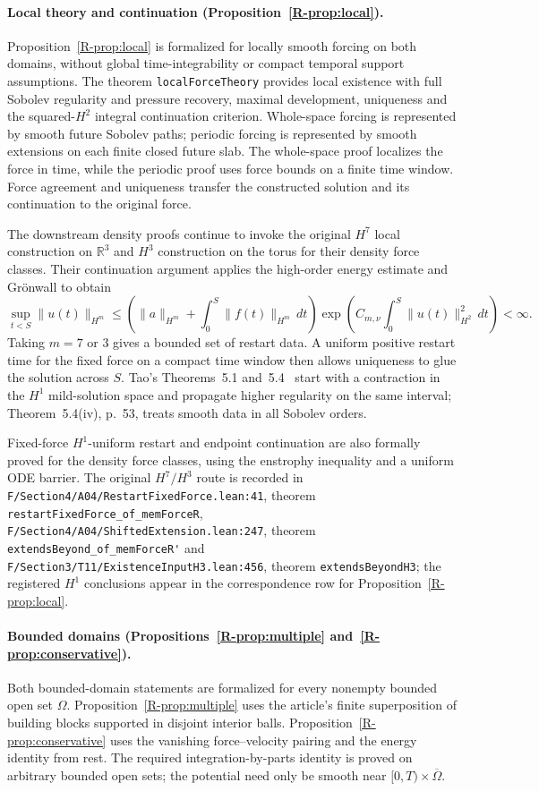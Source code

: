 \documentclass[11pt,a4paper]{article}
\newcommand{\code}[1]{\nolinkurl{#1}}
\newcommand{\paperref}[1]{\ref{R-#1}}
\newcommand{\source}[4]{\code{#1.lean:#2}, #4 \code{#3}}
\begin{document}
\paragraph{Local theory and continuation (Proposition~\paperref{prop:local}).}
Proposition~\paperref{prop:local} is formalized for locally smooth forcing on
both domains, without global time-integrability or compact temporal support
assumptions. The theorem \code{localForceTheory} provides local existence
with full Sobolev regularity and pressure recovery, maximal development,
uniqueness and the squared-$H^2$ integral continuation criterion. Whole-space
forcing is represented by smooth future Sobolev paths; periodic forcing is
represented by smooth extensions on each finite closed future slab.
The whole-space proof localizes the force in time, while the periodic proof
uses force bounds on a finite time window. Force agreement and uniqueness
transfer the constructed solution and its continuation to the original force.

The downstream density proofs continue to invoke the original $H^7$ local
construction on $\mathbb R^3$ and $H^3$ construction on the torus for their
density force classes. Their continuation argument applies the high-order
energy estimate and Gr\"onwall to obtain
\[
 \sup_{t<S}\|u(t)\|_{H^m}
 \le\left(\|a\|_{H^m}+\int_0^S\|f(t)\|_{H^m}\,dt\right)
 \exp\!\left(C_{m,\nu}\int_0^S\|u(t)\|_{H^2}^2\,dt\right)<\infty.
\]
Taking $m=7$ or $3$ gives a bounded set of restart data. A uniform positive
restart time for the fixed force on a compact time window then allows
uniqueness to glue the solution across $S$.
Tao's Theorems~5.1 and~5.4~\cite{tao} start with a contraction in the $H^1$
mild-solution space and propagate higher regularity on the same interval;
Theorem~5.4(iv), p.~53, treats smooth data in all Sobolev orders.

Fixed-force $H^1$-uniform restart and endpoint continuation are also formally
proved for the density force classes, using the enstrophy inequality and a
uniform ODE barrier. The original $H^7/H^3$ route is recorded in
\source{F/Section4/A04/RestartFixedForce}{41}{restartFixedForce_of_memForceR}{theorem},
\source{F/Section4/A04/ShiftedExtension}{247}{extendsBeyond_of_memForceR'}{theorem}
and \source{F/Section3/T11/ExistenceInputH3}{456}{extendsBeyondH3}{theorem};
the registered $H^1$ conclusions appear in the correspondence row for
Proposition~\paperref{prop:local}.

\paragraph{Bounded domains (Propositions~\paperref{prop:multiple} and~\paperref{prop:conservative}).}
Both bounded-domain statements are formalized for every nonempty bounded
open set $\Omega$. Proposition~\paperref{prop:multiple} uses the article's
finite superposition of building blocks supported in disjoint interior balls.
Proposition~\paperref{prop:conservative} uses the vanishing force--velocity
pairing and the energy identity from rest. The required integration-by-parts
identity is proved on arbitrary bounded open sets; the potential need only
be smooth near $[0,T)\times\overline\Omega$.
\end{document}
